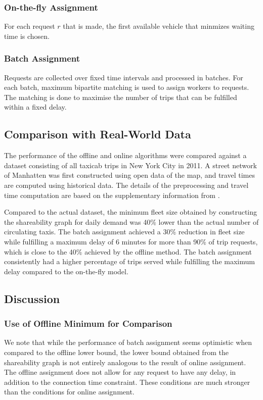\documentclass[urop]{socreport}
\begin{document}
\subsubsection{On-the-fly Assignment}
For each request $r$ that is made, the first available vehicle that minmizes waiting time is chosen.

\subsubsection{Batch Assignment}
Requests are collected over fixed time intervals and processed in batches. For each batch, maximum bipartite matching is used to assign workers to requests. The matching is done to maximise the number of trips that can be fulfilled within a fixed delay.

\subsection{Comparison with Real-World Data}
The performance of the offline and online algorithms were compared against a dataset consisting of all taxicab trips in New York City in 2011. A street network of Manhatten was first constructed using open data of the map, and travel times are computed using historical data. The details of the preprocessing and travel time computation are based on the supplementary information from \cite{preprocess}. 

Compared to the actual dataset, the minimum fleet size obtained by constructing the shareability graph for daily demand was 40\% lower than the actual number of circulating taxis. The batch assignment achieved a 30\% reduction in fleet size while fulfilling a maximum delay of 6 minutes for more than 90\% of trip requests, which is close to the 40\% achieved by the offline method. The batch assignment consistently had a higher percentage of trips served while fulfilling the maximum delay compared to the on-the-fly model.

\subsection{Discussion}
\subsubsection{Use of Offline Minimum for Comparison}
We note that while the performance of batch assignment seems optimistic when compared to the offline lower bound, the lower bound obtained from the shareability graph is not entirely analogous to the result of online assignment. The offline assignment does not allow for any request to have any delay, in addition to the connection time constraint. These conditions are much stronger than the conditions for online assignment.
\end{document}
